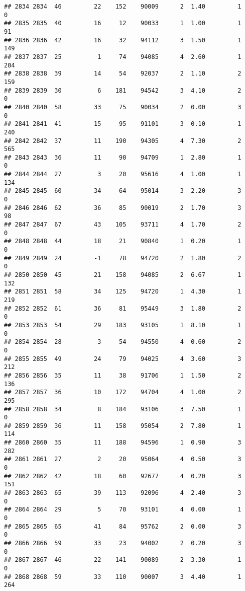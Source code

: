 \documentclass[
]{article}
\begin{document}
\begin{verbatim}
## 2834 2834  46         22    152    90009      2  1.40         1        0
## 2835 2835  40         16     12    90033      1  1.00         1       91
## 2836 2836  42         16     32    94112      3  1.50         1      149
## 2837 2837  25          1     74    94085      4  2.60         1      204
## 2838 2838  39         14     54    92037      2  1.10         2      159
## 2839 2839  30          6    181    94542      3  4.10         2        0
## 2840 2840  58         33     75    90034      2  0.00         3        0
## 2841 2841  41         15     95    91101      3  0.10         1      240
## 2842 2842  37         11    190    94305      4  7.30         2      565
## 2843 2843  36         11     90    94709      1  2.80         1        0
## 2844 2844  27          3     20    95616      4  1.00         1      134
## 2845 2845  60         34     64    95014      3  2.20         3        0
## 2846 2846  62         36     85    90019      2  1.70         3       98
## 2847 2847  67         43    105    93711      4  1.70         2        0
## 2848 2848  44         18     21    90840      1  0.20         1        0
## 2849 2849  24         -1     78    94720      2  1.80         2        0
## 2850 2850  45         21    158    94085      2  6.67         1      132
## 2851 2851  58         34    125    94720      1  4.30         1      219
## 2852 2852  61         36     81    95449      3  1.80         2        0
## 2853 2853  54         29    183    93105      1  8.10         1        0
## 2854 2854  28          3     54    94550      4  0.60         2        0
## 2855 2855  49         24     79    94025      4  3.60         3      212
## 2856 2856  35         11     38    91706      1  1.50         2      136
## 2857 2857  36         10    172    94704      4  1.00         2      295
## 2858 2858  34          8    184    93106      3  7.50         1        0
## 2859 2859  36         11    158    95054      2  7.80         1      114
## 2860 2860  35         11    188    94596      1  0.90         3      282
## 2861 2861  27          2     20    95064      4  0.50         3        0
## 2862 2862  42         18     60    92677      4  0.20         3      151
## 2863 2863  65         39    113    92096      4  2.40         3        0
## 2864 2864  29          5     70    93101      4  0.00         1        0
## 2865 2865  65         41     84    95762      2  0.00         3        0
## 2866 2866  59         33     23    94002      2  0.20         3        0
## 2867 2867  46         22    141    90089      2  3.30         1        0
## 2868 2868  59         33    110    90007      3  4.40         1      264

\end{verbatim}
\end{document}
